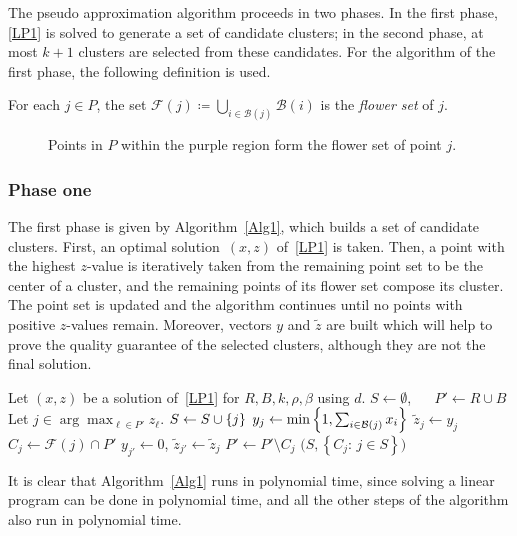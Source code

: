 The pseudo approximation algorithm proceeds in two phases. 
In the first phase, \ref{LP1} is solved to generate a set of candidate clusters; in the second phase, at most \(k+1\) clusters are selected from these candidates. 
For the algorithm of the first phase, the following definition is used.
\begin{definition}
    For each $j \in P$, the set $\mathcal{F}(j) \coloneqq \bigcup_{i \in \mathcal{B}(j)}\mathcal{B}(i)$ is the \emph{flower set} of $j$.
\end{definition}
\begin{figure}[h]
    \centering
    
    \caption{Points in $P$ within the purple region form the flower set of point $j$.}
\end{figure}

\subsubsection{Phase one}

The first phase is given by  Algorithm~\ref{Alg1}, which builds a set of candidate clusters. 
First, an optimal solution~$(x,z)$ of~\ref{LP1} is taken. 
Then, a point with the highest $z$-value is iteratively taken from the remaining point set to be the center of a cluster, and the remaining points of its flower set compose its cluster. 
The point set is updated and the algorithm continues until no points with positive $z$-values remain. 
Moreover, vectors $y$ and $\tilde{z}$ are built which will help to prove the quality guarantee of the selected clusters, although they are not the final solution.

\begin{algorithm}
    \caption{\sc FindCandidates\((R,B,\rho,\beta,d,k)\)}
    \label{Alg1}
    \begin{algorithmic}[1]
        \State Let $(x,z)$ be a solution of~\ref{LP1} for $R, B, k, \rho, \beta$ using $d$. 
        \State $S \gets \emptyset$, $\quad$ $P' \gets R \cup B$
        \State Let $j \in \arg\max_{\ell \in P'} z_\ell$.
        \State $S \gets S \cup \left\{j\right\}$
        \State $y_j \gets \min\left\{1,\sum_{i\in\mathcal{B}(j)} x_i\right\}$
        \State $\tilde{z}_j \gets y_j$
        \State $C_j \gets \mathcal{F}(j)\cap P'$
        \State $y_{j'} \gets 0$, \quad $\tilde{z}_{j'} \gets \tilde{z}_j$
        \EndFor
        \State $P' \gets P' \setminus C_j$
        \EndWhile
        \State \Return $\Big(S,\left\{ C_j : \,j \in S \right\} \Big)$
    \end{algorithmic}
\end{algorithm}
It is clear that {Algorithm~\ref{Alg1}} runs in polynomial time, since solving a linear program can be done in polynomial time, and all the other steps of the algorithm also run in polynomial time.

